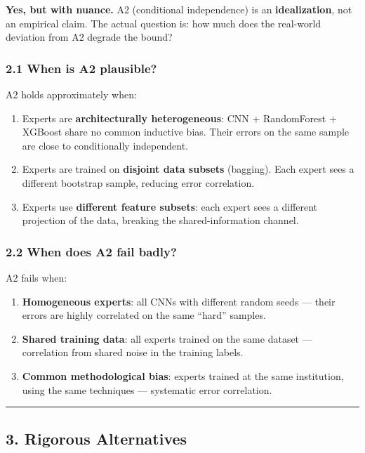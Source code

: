 \documentclass[
  12pt,
]{article}
\begin{document}
\textbf{Yes, but with nuance.} A2 (conditional independence) is an \textbf{idealization}, not an empirical claim. The actual question is: how much does the real-world deviation from A2 degrade the bound?

\subsubsection{2.1 When is A2 plausible?}

A2 holds approximately when:
\begin{enumerate}
\item Experts are \textbf{architecturally heterogeneous}: CNN + RandomForest + XGBoost share no common inductive bias. Their errors on the same sample are close to conditionally independent.
\item Experts are trained on \textbf{disjoint data subsets} (bagging). Each expert sees a different bootstrap sample, reducing error correlation.
\item Experts use \textbf{different feature subsets}: each expert sees a different projection of the data, breaking the shared-information channel.
\end{enumerate}

\subsubsection{2.2 When does A2 fail badly?}

A2 fails when:
\begin{enumerate}
\item \textbf{Homogeneous experts}: all CNNs with different random seeds — their errors are highly correlated on the same ``hard'' samples.
\item \textbf{Shared training data}: all experts trained on the same dataset — correlation from shared noise in the training labels.
\item \textbf{Common methodological bias}: experts trained at the same institution, using the same techniques — systematic error correlation.
\end{enumerate}

\begin{center}\rule{0.5\linewidth}{0.5pt}\end{center}

\subsection{3. Rigorous Alternatives}\label{rigorous-alternatives}
\end{document}
